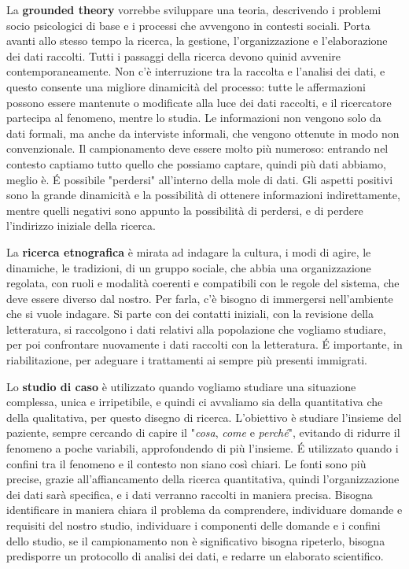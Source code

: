 La \textbf{grounded theory} vorrebbe sviluppare una teoria, descrivendo i problemi socio psicologici di base e i processi che avvengono in contesti sociali. Porta avanti allo stesso tempo la ricerca, la gestione, l'organizzazione e l'elaborazione dei dati raccolti. Tutti i passaggi della ricerca devono quinid avvenire contemporaneamente. Non c'è interruzione tra la raccolta e l'analisi dei dati, e questo consente una migliore dinamicità del processo: tutte le affermazioni possono essere mantenute o modificate alla luce dei dati raccolti, e il ricercatore partecipa al fenomeno, mentre lo studia. Le informazioni non vengono solo da dati formali, ma anche da interviste informali, che vengono ottenute in modo non convenzionale. Il campionamento deve essere molto più numeroso: entrando nel contesto captiamo tutto quello che possiamo captare, quindi più dati abbiamo, meglio è.
\'E possibile "perdersi" all'interno della mole di dati. Gli aspetti positivi sono la grande dinamicità e la possibilità di ottenere informazioni indirettamente, mentre quelli negativi sono appunto la possibilità di perdersi, e di perdere l'indirizzo iniziale della ricerca.

La \textbf{ricerca etnografica} è mirata ad indagare la cultura, i modi di agire, le dinamiche, le tradizioni, di un gruppo sociale, che abbia una organizzazione regolata, con ruoli e modalità coerenti e compatibili con le regole del sistema, che deve essere diverso dal nostro. Per farla, c'è bisogno di immergersi nell'ambiente che si vuole indagare. Si parte con dei contatti iniziali, con la revisione della letteratura, si raccolgono i dati relativi alla popolazione che vogliamo studiare, per poi confrontare nuovamente i dati raccolti con la letteratura.
\'E importante, in riabilitazione, per adeguare i trattamenti ai sempre più presenti immigrati.

Lo \textbf{studio di caso} è utilizzato quando vogliamo studiare una situazione complessa, unica e irripetibile, e quindi ci avvaliamo sia della quantitativa che della qualitativa, per questo disegno di ricerca. L'obiettivo è studiare l'insieme del paziente, sempre cercando di capire il "\textit{cosa}, \textit{come} e \textit{perché}", evitando di ridurre il fenomeno a poche variabili, approfondendo di più l'insieme. \'E utilizzato quando i confini tra il fenomeno e il contesto non siano così chiari. Le fonti sono più precise, grazie all'affiancamento della ricerca quantitativa, quindi l'organizzazione dei dati sarà specifica, e i dati verranno raccolti in maniera precisa. Bisogna identificare in maniera chiara il problema da comprendere, individuare domande e requisiti del nostro studio, individuare i componenti delle domande e i confini dello studio, se il campionamento non è significativo bisogna ripeterlo, bisogna predisporre un protocollo di analisi dei dati, e redarre un elaborato scientifico.


